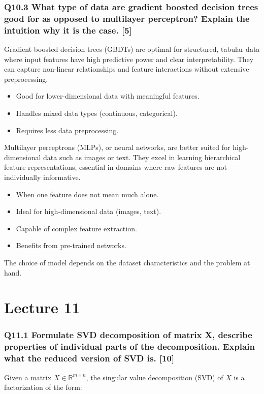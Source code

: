 \documentclass[11pt]{article}
\begin{document}
\section{Q10.3 What type of data are gradient boosted decision trees good for as opposed to multilayer perceptron? Explain the intuition why it is the case. [5]}


Gradient boosted decision trees (GBDTs) are optimal for structured, tabular data where input features have high predictive power and clear interpretability. They can capture non-linear relationships and feature interactions without extensive preprocessing.

\begin{itemize}
    \item Good for lower-dimensional data with meaningful features.
    \item Handles mixed data types (continuous, categorical).
    \item Requires less data preprocessing.
\end{itemize}

Multilayer perceptrons (MLPs), or neural networks, are better suited for high-dimensional data such as images or text. They excel in learning hierarchical feature representations, essential in domains where raw features are not individually informative.

\begin{itemize}
    \item When one feature does not mean much alone.
    \item Ideal for high-dimensional data (images, text).
    \item Capable of complex feature extraction.
    \item Benefits from pre-trained networks.
\end{itemize}

The choice of model depends on the dataset characteristics and the problem at hand.

\part{Lecture 11}
\section{Q11.1 Formulate SVD decomposition of matrix X, describe properties of individual parts of the decomposition. Explain what the reduced version of SVD is. [10]}

Given a matrix \( X \in \mathbb{R}^{m \times n} \), the singular value decomposition (SVD) of \( X \) is a factorization of the form:
\end{document}
